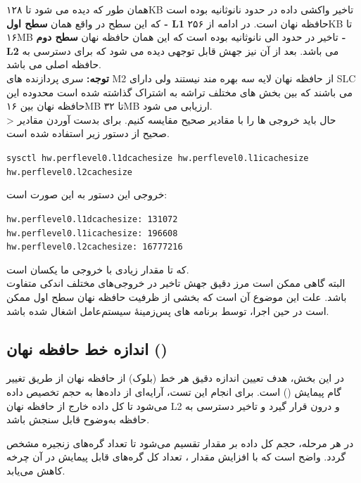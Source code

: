 \documentclass{article}
\begin{document}
\begin{tcolorbox}[colback=green!5!white, colframe=green!75!black, title=نتایج]
	همان طور که دیده می شود تا ۱۲۸KB تاخیر واکشی داده در حدود  نانوثانیه بوده است که این سطح در واقع همان \textbf{سطح اول - L1} حافظه نهان است. در ادامه از ۲۵۶KB تا ۱۶MB تاخیر در حدود  الی  نانوثانیه بوده است که این همان حافظه نهان \textbf{سطح دوم - L2 } می باشد. بعد از آن نیز جهش قابل توجهی دیده می شود که برای دسترسی به حافظه اصلی می باشد.\\
	\textbf{توجه:} سری پردازنده های M2 از حافظه نهان لایه سه بهره مند نیستند ولی دارای SLC می باشند که بین بخش های مختلف تراشه به اشتراک گذاشته شده است محدوده این حافظه نهان بین ۱۶MB تا ۳۲MB ارزیابی می شود. \\
	
	> حال باید خروجی ها را با مقادیر صحیح مقایسه کنیم. برای بدست آوردن مقادیر صحیح از دستور زیر استفاده شده است.
\begin{latin}
	\texttt{sysctl hw.perflevel0.l1dcachesize hw.perflevel0.l1icachesize hw.perflevel0.l2cachesize}
\end{latin}

خروجی این دستور به این صورت است:
\begin{latin}
	\texttt{hw.perflevel0.l1dcachesize: 131072\\
		hw.perflevel0.l1icachesize: 196608\\
		hw.perflevel0.l2cachesize: 16777216}
\end{latin}
که تا مقدار زیادی با خروجی ما یکسان است.\\ 

البته گاهی ممکن است مرز دقیق جهش تاخیر در خروجی‌های مختلف اندکی متفاوت باشد.  علت این موضوع آن است که بخشی از ظرفیت حافظه نهان سطح اول ممکن است در حین اجرا، توسط برنامه ‌های پس‌زمینهٔ سیستم‌عامل اشغال شده باشد.

\end{tcolorbox}

\subsection{اندازه خط حافظه نهان ()}

در این بخش، هدف تعیین اندازه دقیق هر خط (بلوک) از حافظه نهان از طریق تغییر گام پیمایش () است. برای انجام این تست، آرایه‌ای از داده‌ها به حجم  تخصیص داده می‌شود تا کل داده خارج از حافظه نهان L2 و درون  قرار گیرد و تاخیر دسترسی به حافظه به‌وضوح قابل سنجش باشد.

در هر مرحله، حجم کل داده بر مقدار  تقسیم می‌شود تا تعداد گره‌های زنجیره مشخص گردد. واضح است که با افزایش مقدار ، تعداد کل گره‌های قابل پیمایش در آن چرخه کاهش می‌یابد.
\end{document}
